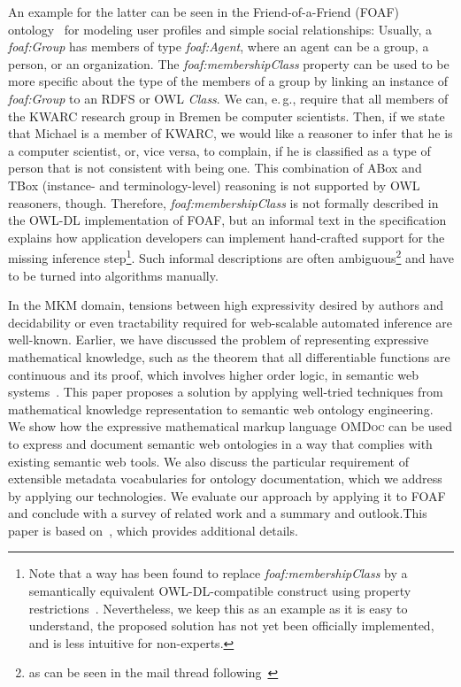 \documentclass{llncs}
\renewcommand{\omdoc}{\textsc{OMDoc}\xspace}
\begin{document}
An example for the latter can be seen in the Friend-of-a-Friend (FOAF)
ontology~\cite{FOAF:spec} for modeling user profiles and simple social relationships:
Usually, a \textit{foaf:Group} has members of type \textit{foaf:Agent}, where an agent can
be a group, a person, or an organization.  The \textit{foaf:membership\-Class} property
can be used to be more specific about the type of the members of a group by linking an
instance of \textit{foaf:Group} to an RDFS or OWL \textit{Class}.  We can, e.\,g., require
that all members of the KWARC research group in Bremen be computer scientists.  Then, if
we state that Michael is a member of KWARC, we would like a reasoner to infer that he is a
computer scientist, or, vice versa, to complain, if he is classified as a type of person
that is not consistent with being one.  This combination of ABox and TBox (instance- and
terminology-level) reasoning is not supported by OWL reasoners, though.  Therefore,
\textit{foaf:membershipClass} is not formally described in the OWL-DL implementation of
FOAF, but an informal text in the specification explains how application developers can
implement hand-crafted support for the missing inference step\footnote{Note that a way has
  been found to replace \textit{foaf:membershipClass} by a semantically equivalent
  OWL-DL-compatible construct using property
  restrictions~\cite{Alford:MailFOAFmembershipClass2007}.  Nevertheless, we keep this as
  an example as it is easy to understand, the proposed solution has not yet been
  officially implemented, and is less intuitive for non-experts.}.  Such informal
descriptions are often ambiguous\footnote{as can be seen in the mail thread
  following~\cite{Alford:MailFOAFmembershipClass2007}} and have to be turned into
algorithms manually.

In the MKM domain, tensions between high expressivity desired by authors and decidability
or even tractability required for web-scalable automated inference are well-known.
Earlier, we have discussed the problem of representing expressive mathematical knowledge,
such as the theorem that all differentiable functions are continuous and its proof, which
involves higher order logic, in semantic web systems~\cite{LanKoh:swmkm07}.  This paper
proposes a solution by applying well-tried techniques from mathematical knowledge
representation to semantic web ontology engineering.  We show how the expressive
mathematical markup language \omdoc can be used to express and document semantic web
ontologies in a way that complies with existing semantic web tools.  We also discuss the
particular requirement of extensible metadata vocabularies for ontology documentation,
which we address by applying our technologies.  We evaluate our approach by applying it to
FOAF and conclude with a survey of related work and a summary and outlook.\ifpublic\else This paper is
based on~\cite{LK:OMDocOntologyLanguage08}, which provides additional details.\fi
\end{document}
